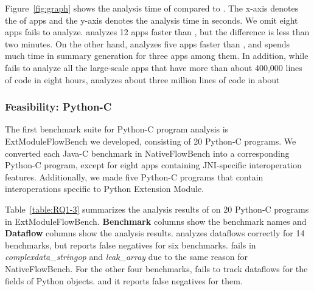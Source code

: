 Figure~\ref{fig:graph} shows the analysis time of \ours compared to \lees.
The x-axis denotes the  of apps and the y-axis denotes the analysis time
in seconds. We omit eight apps \lees fails to analyze.
\lees analyzes 12 apps faster than \ours, but the difference is less than two minutes. 
On the other hand, \ours analyzes five apps faster than \lees, and \lees spends
much time in summary generation for three apps among them. 
In addition, while \lees fails to analyze all the large-scale apps that have
more than about 400,000 lines of code in eight hours, \ours analyzes about
three million lines of code in about 

\subsubsection{Feasibility: Python-C}


The first benchmark suite for Python-C program analysis is ExtModuleFlowBench we developed,
consisting of 20 Python-C programs.
We converted each Java-C benchmark in NativeFlowBench into a
corresponding Python-C program, except for eight apps containing JNI-specific interoperation
features. Additionally, we made five Python-C programs that contain interoperations
specific to Python Extension Module.

Table~\ref{table:RQ1-3} summarizes the analysis results of \ours
on 20 Python-C programs in ExtModuleFlowBench.
{\bf Benchmark} columns show the benchmark names and {\bf Dataflow}
columns show the analysis results.
\ours analyzes dataflows correctly for 14 benchmarks, but reports false
negatives for six benchmarks.
\ours fails in {\it complexdata\_stringop} and {\it leak\_array} due to the
same reason for NativeFlowBench.
For the other four benchmarks, \ours fails to track dataflows for the fields of Python objects. 
 and it
reports false negatives for them.

